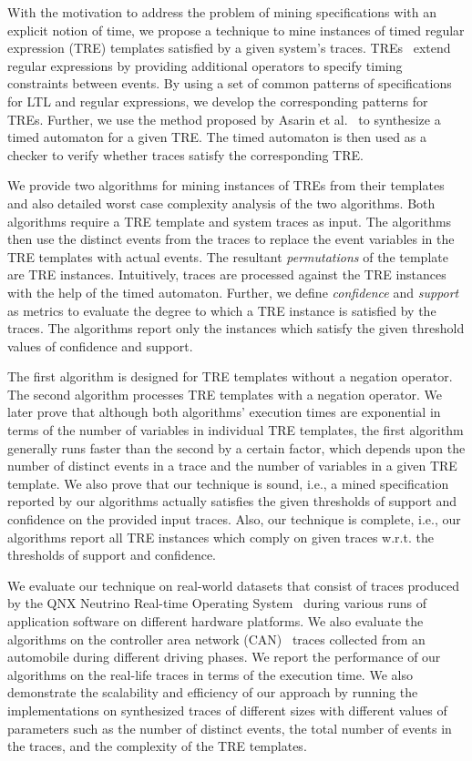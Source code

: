 \documentclass[]{sigplanconf}
\begin{document}
With the motivation to address the problem of mining specifications with an explicit notion of time, we propose a technique to mine instances of timed regular expression (TRE) templates satisfied by a given system's traces. TREs~\cite{timedregex} extend regular expressions by providing additional operators to specify timing constraints between events. By using a set of common patterns of specifications for LTL and regular expressions, we develop the corresponding patterns for TREs. Further, we use the method proposed by Asarin et al.~\cite{timedregex} to synthesize a timed automaton for a given TRE. The timed automaton is then used as a checker to verify whether traces satisfy the corresponding TRE.

We provide two algorithms for mining instances of TREs from their templates and also detailed worst case complexity analysis of the two algorithms. Both algorithms require a TRE template and system traces as input. The algorithms then use the distinct events from the traces to replace the event variables in the TRE templates with actual events. The resultant \emph{permutations} of the template are TRE instances.
Intuitively, traces are processed against the TRE instances with the help of the timed automaton. Further, we define  \emph{confidence} and \emph{support} as metrics to evaluate the degree to which a TRE instance is satisfied by the traces. The algorithms report only the instances which satisfy the given threshold values of confidence and support.

The first algorithm is designed for TRE templates without a negation operator. The second algorithm processes TRE templates with a negation operator.
We later prove that although both algorithms' execution times are exponential in terms of the number of variables in individual TRE templates, the first algorithm generally runs faster than the second by a certain factor, which depends upon the number of distinct events in a trace and the number of variables in a given TRE template. We also prove that our technique is sound, i.e., a mined specification reported by our algorithms actually satisfies the given thresholds of support and confidence on the provided input traces. Also, our technique is complete, i.e., our algorithms report all TRE instances which comply on given traces w.r.t. the thresholds of support and confidence.

We evaluate our technique on real-world datasets that consist of traces produced by the QNX Neutrino Real-time Operating System~\cite{QNX_RTOS} during various runs of application software on different hardware platforms. We also evaluate the algorithms on the controller area network (CAN)~\cite{Davis2007} traces collected from an automobile during different driving phases. We report the performance of our algorithms on the real-life traces in terms of the execution time. We also demonstrate the scalability and efficiency of our approach by running the implementations on synthesized traces of different sizes with different values of parameters such as the number of distinct events, the total number of events in the traces, and the complexity of the TRE templates.
\end{document}
